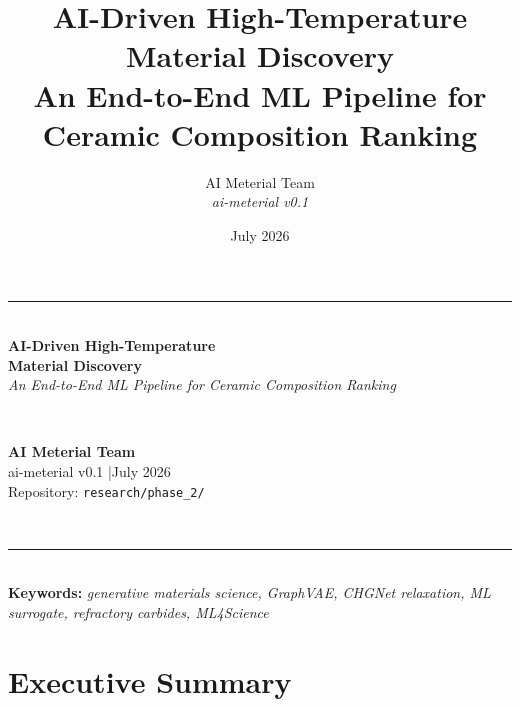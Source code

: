 \documentclass[11pt,a4paper]{report}
\title{\textbf{AI-Driven High-Temperature Material Discovery} \\[6pt]
  \large An End-to-End ML Pipeline for Ceramic Composition Ranking}
\author{AI Meterial Team \\ \textit{ai-meterial v0.1}}
\date{July 2026}
\begin{document}
\begin{titlepage}
\centering
\vspace*{1.5cm}
{\color{aiBlue}\rule{\linewidth}{1.5pt}}\\[0.5cm]
{\Huge\bfseries\color{aiBlue} AI-Driven High-Temperature \\[2pt]
  Material Discovery}\\[0.4cm]
{\large \textit{An End-to-End ML Pipeline for Ceramic Composition Ranking}}\\[1.2cm]

\\[1.5cm]

\begin{minipage}{0.75\textwidth}
\centering
\textbf{AI Meterial Team} \\
\small ai-meterial v0.1 \quad|\quad July 2026 \\
\small Repository: \texttt{research/phase\_2/}
\end{minipage}\\[2cm]

{\color{aiBlue}\rule{\linewidth}{1.5pt}}\\[0.3cm]
\small\textbf{Keywords:} \textit{generative materials science, GraphVAE, CHGNet relaxation, ML surrogate, refractory carbides, ML4Science}
\vspace{1.5cm}
\end{titlepage}

\tableofcontents
\listoffigures
\listoftables
\newpage

\chapter*{Executive Summary}
\end{document}
